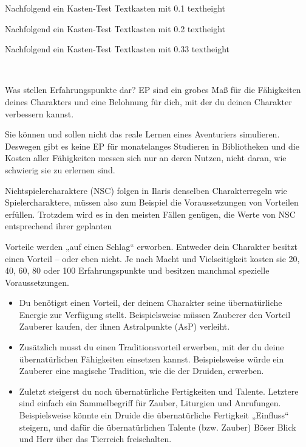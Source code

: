 \begin{multicols}{2}
\vfill %
\begin{kasten}{0.1\textheight}{Nachfolgend ein Kasten-Test}
	Textkasten mit 0.1 textheight \vspace{1.2cm}
\end{kasten}

\begin{kasten}{0.2\textheight}{Nachfolgend ein Kasten-Test}
	Textkasten mit 0.2 textheight \vspace{3.7cm}
\end{kasten}

\begin{kasten}{0.33\textheight}{Nachfolgend ein Kasten-Test}
	Textkasten mit 0.33 textheight 
\end{kasten}

\vfill
\ 
\columnbreak

\begin{kasten}{0.65\textheight}{Was stellen Erfahrungspunkte dar?}
EP sind ein grobes Maß für die Fähigkeiten deines 
Charakters und eine Belohnung für dich, mit der du 
deinen Charakter verbessern kannst. 

Sie können und sollen nicht das reale Lernen eines 
Aventuriers simulieren. Deswegen gibt es keine EP für 
monatelanges Studieren in Bibliotheken und die Kosten 
aller Fähigkeiten messen sich nur an deren Nutzen, nicht 
daran, wie schwierig sie zu erlernen sind. 

Nichtspielercharaktere (NSC) folgen in Ilaris denselben 
Charakterregeln wie Spielercharaktere, müssen also zum 
Beispiel die Voraussetzungen von Vorteilen erfüllen. 
Trotzdem wird es in den meisten Fällen genügen, 
die Werte von NSC entsprechend ihrer geplanten 

\medskip\noindent%
Vorteile werden „auf einen Schlag“ erworben. Entweder
dein Charakter besitzt einen Vorteil – oder eben nicht. Je
nach Macht und Vielseitigkeit kosten sie 20, 40, 60, 80 oder
100 Erfahrungspunkte und besitzen manchmal spezielle
Voraussetzungen.
\begin{itemize}
	\item  Du benötigst einen Vorteil, der deinem Charakter
		seine übernatürliche Energie zur Verfügung stellt.
		Beispielsweise müssen Zauberer den Vorteil Zauberer
		kaufen, der ihnen Astralpunkte (AsP) verleiht.
	\item  Zusätzlich musst du einen Traditionsvorteil erwerben,
		mit der du deine übernatürlichen Fähigkeiten einsetzen
		kannst. Beispielsweise würde ein Zauberer eine magische
		Tradition, wie die der Druiden, erwerben.
	\item  Zuletzt steigerst du noch übernatürliche Fertigkeiten und
		Talente. Letztere sind einfach ein Sammelbegriff für Zauber, Liturgien und Anrufungen. Beispielsweise könnte ein Druide die übernatürliche Fertigkeit „Einfluss“ steigern,
		und dafür die übernatürlichen Talente (bzw. Zauber) Böser
		Blick und Herr über das Tierreich freischalten.
\end{itemize}
\end{kasten}
\end{multicols}

